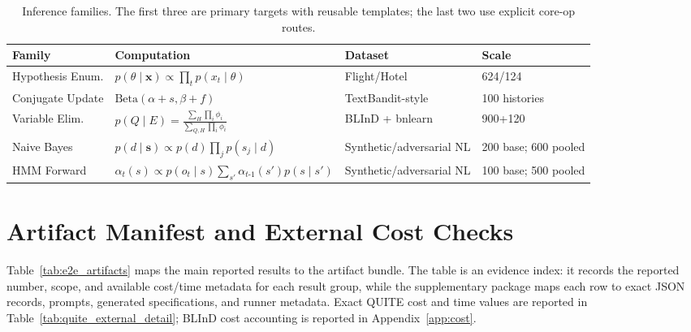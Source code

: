 \documentclass{article}
\begin{document}
\begin{table}[ht]
\centering
\scriptsize
\caption{Inference families. The first three are primary targets with reusable templates; the last two use explicit core-op routes.}
\begin{tabular}{@{}llll@{}}
\toprule
Family & Computation & Dataset & Scale \\
\midrule
Hypothesis Enum. & $p(\theta \mid \mathbf{x}) \propto \prod_t p(x_t \mid \theta)$ & Flight/Hotel & 624/124 \\
Conjugate Update & $\text{Beta}(\alpha{+}s, \beta{+}f)$ & TextBandit-style & 100 histories \\
Variable Elim. & $p(Q \mid E) = \frac{\sum_H \prod_i \phi_i}{\sum_{Q,H} \prod_i \phi_i}$ & BLInD + bnlearn & 900+120 \\
\midrule
Naive Bayes & $p(d \mid \mathbf{s}) \propto p(d) \prod_j p(s_j \mid d)$ & Synthetic/adversarial NL & 200 base; 600 pooled \\
HMM Forward & $\alpha_t(s) \propto p(o_t \mid s) \sum_{s'} \alpha_{t\text{-}1}(s') p(s \mid s')$ & Synthetic/adversarial NL & 100 base; 500 pooled \\
\bottomrule
\end{tabular}
\end{table}

\section{Artifact Manifest and External Cost Checks}
\label{app:e2e_artifacts}

Table~\ref{tab:e2e_artifacts} maps the main reported results to the artifact bundle.
The table is an evidence index: it records the reported number, scope, and available cost/time metadata for each result group, while the supplementary package maps each row to exact JSON records, prompts, generated specifications, and runner metadata.
Exact QUITE cost and time values are reported in Table~\ref{tab:quite_external_detail}; BLInD cost accounting is reported in Appendix~\ref{app:cost}.
\end{document}
